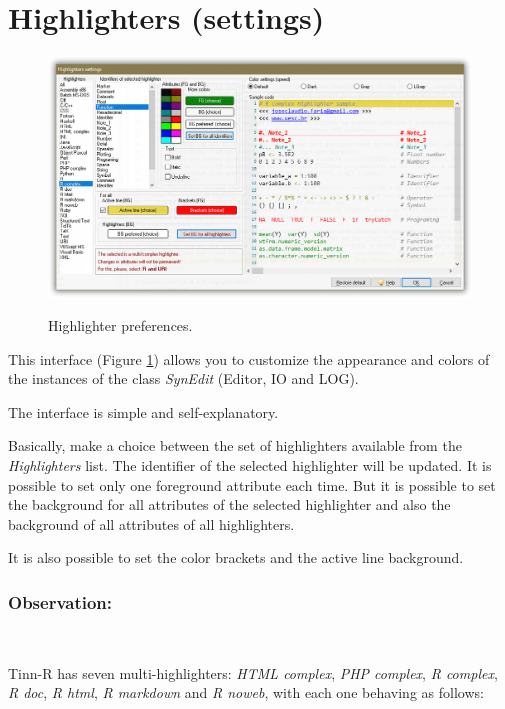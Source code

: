 
\hypertarget{working_highlighters}{}
\section{Highlighters (settings)}

\begin{figure}[H]
  \includegraphics[scale=0.50]{./res/dlg_highlighter_settings.png}\\
  \caption{Highlighter preferences.}
  \label{fig:highlighter_preferences}
\end{figure}

This interface
(Figure \ref{fig:highlighter_preferences})
allows you to customize the appearance and colors of the
instances of the class \textit{SynEdit} (Editor, IO and LOG).

The interface is simple and self-explanatory.

Basically, make a choice between the set of highlighters available
from the \textit{Highlighters} list. The identifier of the selected
highlighter will be updated. It is possible to set only one
foreground attribute each time. But it is possible to set the
background for all attributes of the selected highlighter and also
the background of all attributes of all highlighters.

It is also possible to set the color brackets and the active line
background.


\subsubsection{Observation:}\\

Tinn-R has seven multi-highlighters: \textit{HTML complex}, \textit{PHP complex},
\textit{R complex}, \textit{R doc},  \textit{R html}, \textit{R markdown} and \textit{R noweb},
with each one behaving as follows:

